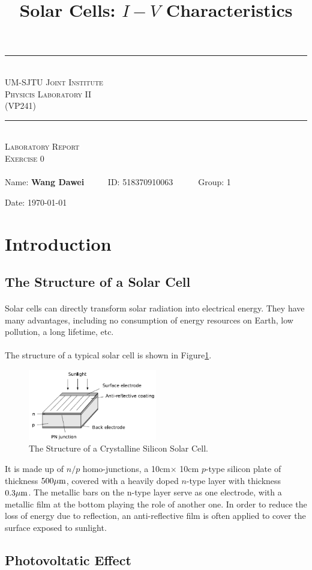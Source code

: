 \documentclass[a4paper]{article}
\title{Solar Cells: $I-V$ Characteristics}
\makeatletter
\def\@Exercisenum{0}
\def\@group{1}
\newif\iffellowornot\fellowornotfalse
\newcommand{\HRule}{\rule{\linewidth}{0.5mm}}
\renewcommand{\maketitle}{
	\begin{titlepage}
	\begin{center}
	\HRule \\[0.8cm]
	\textsc {UM-SJTU Joint Institute \\ Physicis Laboratory II\\(VP241)}\\[0.5cm]
	\HRule \\
	\vfill
	\textsc {Laboratory Report} \\[1.5cm]
	\textsc {Exercise \@Exercisenum} \\[0.8cm]
	\textsc \@title \\ 
	\vfill
	Name: \textbf {Wang Dawei} \ \ \ \ \ ID: 518370910063\ \ \ \ \ \ Group: \@group   
	\iffellowornot
	\\ Name: \@fellowname\ \ \ \ ID: \@fellowID\ \ \ \ \ \ Group: \@group
	\fi
	
	Date: \today 
	\newpage
	\end{center}
	\end{titlepage}
}
\makeatother
\begin{document}
    \maketitle
    \section{Introduction}
    \subsection{The Structure of a Solar Cell}
    \paragraph{} Solar cells can directly transform solar radiation into electrical energy. They have many advantages, including no consumption of energy resources on Earth, low pollution, a long lifetime, etc.
    \vspace{-5mm} 
    \paragraph{} The structure of a typical solar cell is shown in Figure\ref{fig:struct}. 
    \begin{figure}[!ht]
        \centering
        \includegraphics[width=0.5\textwidth]{fig/solarCellStructure.png}
        \caption{The Structure of a Crystalline Silicon Solar Cell.}
        \label{fig:struct}
    \end{figure}
    It is made up of $n/p$ homo-junctions, a 10cm$\times$ 10cm $p$-type silicon plate of thickness $500\mu\rm m$, covered with a heavily doped $n$-type layer with thickness $0.3\mu\rm m$. The metallic bars on the n-type layer serve as one electrode, with a metallic film at the bottom playing the role of another one. In order to reduce the loss of energy due to reflection, an anti-reflective film is often applied to cover the surface exposed to sunlight.
    \subsection{Photovoltatic Effect}
\end{document}
